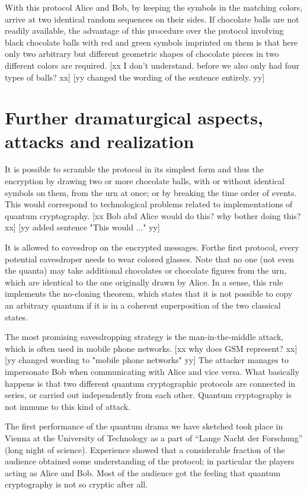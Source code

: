 \documentclass[prb,amssymb,preprint]{revtex4}
\begin{document}
With this protocol Alice and Bob, by keeping the symbols in the matching
colors, arrive at two identical random sequences on their sides.
If chocolate balls are not readily available,
the advantage of this procedure over the protocol involving black chocolate balls
with red and green symbols imprinted on them
is that here only
two arbitrary but different geometric shapes of chocolate pieces in two different colors are required.
[xx I don't
understand. before we also only had four types of balls? xx]
[yy changed the wording of the sentence entirely. yy]

\section{Further dramaturgical aspects, attacks and realization}

It is possible to scramble the protocol in its simplest form and thus the
encryption by drawing two or more chocolate balls, with or without identical
symbols on them, from the urn at once; or by breaking the time order of
events.
This would correspond to technological problems related to
implementations of quantum cryptography.
[xx Bob abd Alice would do this? why bother doing this? xx]
[yy added sentence "This would ..." yy]

It is allowed to eavesdrop on the encrypted
messages. Forthe first protocol, every potential eavesdroper needs
to wear colored glasses. Note that no one (not even
the quanta) may take additional chocolates or chocolate figures from the
urn, which are identical to the one originally drawn by Alice.
In a sense, this rule implements the no-cloning theorem, which states that
it is not possible to copy an arbitrary quantum if it is in a coherent
superposition of the two classical states.

The most promising eavesdropping strategy is the man-in-the-middle
attack, which is often used in mobile phone networks.
[xx why does GSM represent? xx]
[yy changed wording to "mobile phone networks" yy]
The attacker manages to impersonate Bob when communicating with Alice and
vice versa. What basically happens is that two different quantum
cryptographic protocols are connected in series, or carried out
independently from each other. Quantum cryptography is not immune to this
kind of attack.

The first performance of the quantum drama we have sketched took place
in Vienna at the University of Technology as a part of
``Lange Nacht der Forschung'' (long night of science). Experience showed
that a considerable fraction of the audience obtained some understanding of
the protocol; in particular the players acting as Alice and Bob. Most
of the audience got the feeling that quantum cryptography is not so
cryptic after all.
\end{document}
